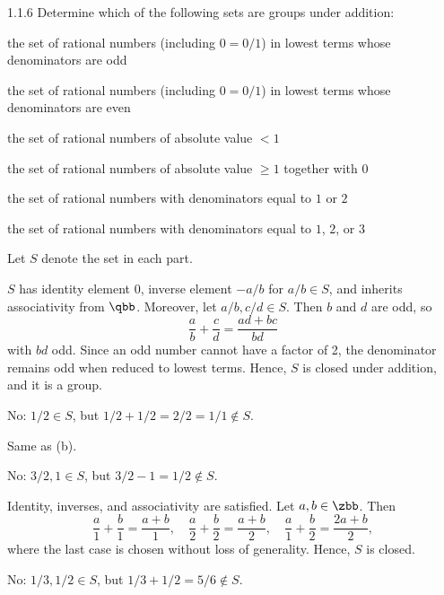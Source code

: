 \begin{exercise}{1.1.6}
    Determine which of the following sets are groups under addition:
    \begin{subexercises}
        \item the set of rational numbers (including $0 = 0/1$) in lowest terms whose denominators are odd
        \item the set of rational numbers (including $0 = 0/1$) in lowest terms whose denominators are even
        \item the set of rational numbers of absolute value $< 1$
        \item the set of rational numbers of absolute value $\ge 1$ together with $0$
        \item the set of rational numbers with denominators equal to $1$ or $2$
        \item the set of rational numbers with denominators equal to $1$, $2$, or $3$
    \end{subexercises}
\end{exercise}

\begin{sol}
    Let $S$ denote the set in each part.
    \begin{subexercises}
        \item $S$ has identity element 0, inverse element $-a/b$ for $a/b \in S$, and inherits associativity from $\qbb$.
	    Moreover, let $a/b, c/d \in S$. Then $b$ and $d$ are odd, so
        \[
        	\frac ab + \frac cd = \frac{ad + bc}{bd}
        \]
        with $bd$ odd.
	    Since an odd number cannot have a factor of 2, the denominator remains odd when reduced to lowest terms.
	    Hence, $S$ is closed under addition, and it is a group.
        \item No: $1/2 \in S$, but $1/2 + 1/2 = 2/2 = 1/1 \notin S$.
        \item Same as (b).
        \item No: $3/2, 1 \in S$, but $3/2 - 1 = 1/2 \notin S$.
        \item Identity, inverses, and associativity are satisfied.
	    Let $a, b \in \zbb$.
	    Then
        \[
        	\frac a1 + \frac b1 = \frac{a + b}1, \quad \frac a2 + \frac b2 = \frac{a + b}2, \quad \frac a1 + \frac b2 = \frac{2a + b}2,
        \]
        where the last case is chosen without loss of generality.
	    Hence, $S$ is closed.
        \item No: $1/3, 1/2 \in S$, but $1/3 + 1/2 = 5/6 \notin S$. \qedhere
    \end{subexercises}
\end{sol}

